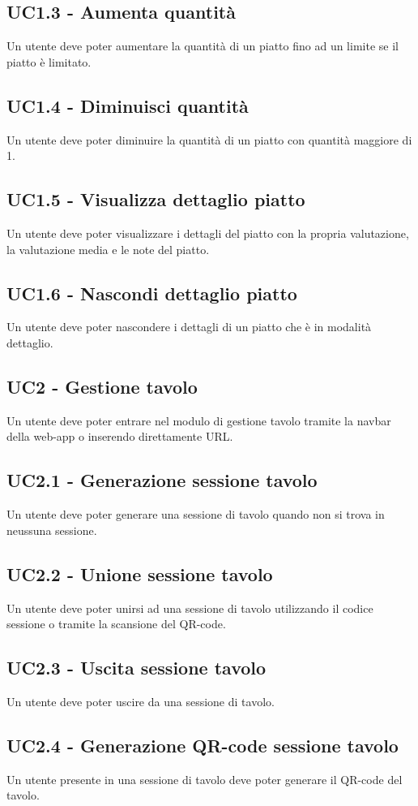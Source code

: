 \subsection{UC1.3 - Aumenta quantità}
Un utente deve poter aumentare la quantità di un piatto fino ad un limite se il piatto è limitato.
\subsection{UC1.4 - Diminuisci quantità}
Un utente deve poter diminuire la quantità di un piatto con quantità maggiore di 1.
\subsection{UC1.5 - Visualizza dettaglio piatto}
Un utente deve poter visualizzare i dettagli del piatto con la propria valutazione, la valutazione media e le note del piatto.
\subsection{UC1.6 - Nascondi dettaglio piatto}
Un utente deve poter nascondere i dettagli di un piatto che è in modalità dettaglio.
\subsection{UC2 - Gestione tavolo}
Un utente deve poter entrare nel modulo di gestione tavolo tramite la navbar della web-app o inserendo direttamente URL.
\subsection{UC2.1 - Generazione sessione tavolo}
Un utente deve poter generare una sessione di tavolo quando non si trova in neussuna sessione.
\subsection{UC2.2 - Unione sessione tavolo}
Un utente deve poter unirsi ad una sessione di tavolo utilizzando il codice sessione o tramite la scansione del QR-code.
\subsection{UC2.3 - Uscita sessione tavolo}
Un utente deve poter uscire da una sessione di tavolo.
\subsection{UC2.4 - Generazione QR-code sessione tavolo}
Un utente presente in una sessione di tavolo deve poter generare il QR-code del tavolo.
